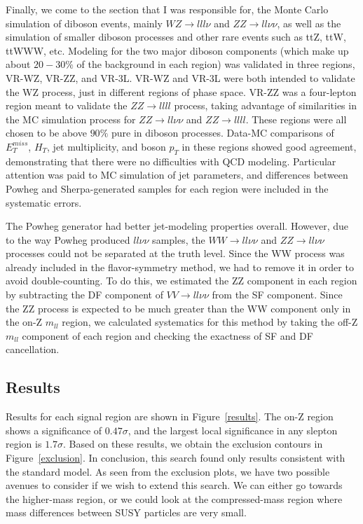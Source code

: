\documentclass{article}
\begin{document}
Finally, we come to the section that I was responsible for, the Monte Carlo simulation of diboson events, mainly $WZ\rightarrow lll\nu$ and $ZZ\rightarrow ll\nu\nu$, as well as the simulation of smaller diboson processes and other rare events such as ttZ, ttW, ttWWW, etc. Modeling for the two major diboson components (which make up about $20-30\%$ of the background in each region) was validated in three regions, VR-WZ, VR-ZZ, and VR-3L. VR-WZ and VR-3L were both intended to validate the WZ process, just in different regions of phase space. VR-ZZ was a four-lepton region meant to validate the $ZZ\rightarrow llll$ process, taking advantage of similarities in the MC simulation process for $ZZ\rightarrow ll\nu\nu$ and $ZZ\rightarrow llll$. These regions were all chosen to be above $90\%$ pure in diboson processes. Data-MC comparisons of $E_T^{miss}$, $H_T$, jet multiplicity, and boson $p_T$ in these regions showed good agreement, demonstrating that there were no difficulties with QCD modeling. Particular attention was paid to MC simulation of jet parameters, and differences between Powheg and Sherpa-generated samples for each region were included in the systematic errors.

The Powheg generator had better jet-modeling properties overall. However, due to the way Powheg produced $ll\nu\nu$ samples, the $WW\rightarrow ll\nu\nu$ and $ZZ\rightarrow ll\nu\nu$ processes could not be separated at the truth level. Since the WW process was already included in the flavor-symmetry method, we had to remove it in order to avoid double-counting. To do this, we estimated the ZZ component in each region by subtracting the DF component of $VV\rightarrow ll\nu\nu$ from the SF component. Since the ZZ process is expected to be much greater than the WW component only in the on-Z $m_{ll}$ region, we calculated systematics for this method by taking the off-Z $m_{ll}$ component of each region and checking the exactness of SF and DF cancellation.

\subsection*{Results}

Results for each signal region are shown in Figure~\ref{results}. The on-Z region shows a significance of $0.47\sigma$, and the largest local significance in any slepton region is $1.7\sigma$. Based on these results, we obtain the exclusion contours in Figure~\ref{exclusion}. In conclusion, this search found only results consistent with the standard model. As seen from the exclusion plots, we have two possible avenues to consider if we wish to extend this search. We can either go towards the higher-mass region, or we could look at the compressed-mass region where mass differences between SUSY particles are very small.
\end{document}
